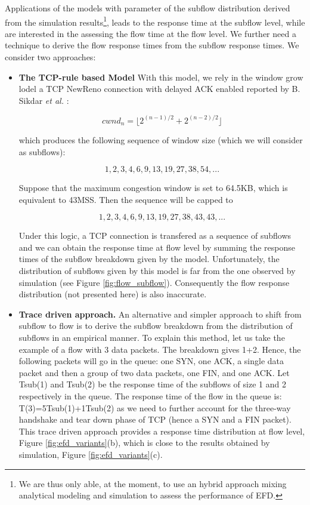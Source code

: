 \documentclass[preprint,12pt]{elsarticle}
\begin{document}
Applications of the models with parameter of the subflow distribution derived from the simulation results\footnote{We are thus only able, at the moment, to use an hybrid approach mixing analytical modeling and simulation to assess the performance of EFD.}, leads to the response time at the subflow level, while are interested in the assessing the flow time at the flow level. We further  need a technique to derive the flow response times from the subflow response times.  We consider two approaches:
\begin{itemize}
\item {\bf The TCP-rule based Model} With this model, we rely in the window grow lodel a TCP  NewReno connection with delayed ACK enabled reported by B. Sikdar \textit{et al.} \cite{Sikdar01analyticmodels}:

\begin{equation}
cwnd_{n} = \lfloor 2^{(n-1)/2} + 2^{(n-2)/2} \rfloor
\end{equation}

which produces the following sequence of window size (which we will consider as subflows):

\begin{equation*}
1,2,3,4,6,9,13,19,27,38,54,...
\end{equation*}

Suppose that the maximum congestion window is set to 64.5KB, which is equivalent to 43MSS. Then the sequence will be capped to 

\begin{equation*}
1,2,3,4,6,9,13,19,27,38,43,43,...
\end{equation*}

Under this logic, a TCP connection is transfered as a sequence of subflows and we can obtain the response time at flow level by summing the response times of the subflow breakdown given by the model. Unfortunately, the distribution of subflows given by this model is far from the one observed by simulation (see Figure \ref{fig:flow_subflow}). Consequently the flow response distribution (not presented here) is also inaccurate.
\item {\bf Trace driven approach.} An alternative and simpler approach to shift from subflow to flow  is to derive the subflow breakdown from the distribution of subflows in an empirical manner. To explain this method, let us take the example of a flow with 3 data packets. The breakdown gives 1+2. Hence, the following packets will go in the queue: one SYN, one ACK, a single data packet and then a group of two data packets, one FIN, and one ACK. Let Tsub(1) and Tsub(2) be the response time of the subflows of size 1 and 2 respectively in the queue. The response time of the flow in the queue is: T(3)=5Tsub(1)+1Tsub(2) as we need to further account for the three-way handshake and tear down phase of TCP (hence a SYN and a FIN packet). This trace driven approach provides  a response time distribution at flow level, Figure \ref{fig:efd_variants}(b), which is close to the results obtained by simulation, Figure \ref{fig:efd_variants}(c). 
\end{itemize}
\end{document}
